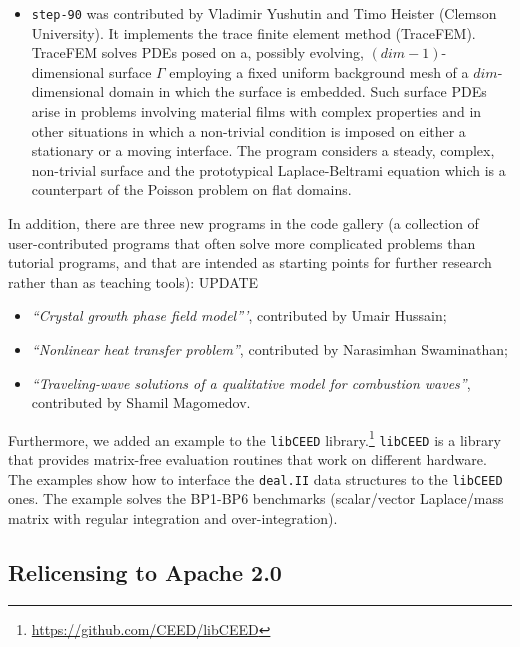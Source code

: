 \documentclass{ansarticle-preprint}
\newcommand{\specialword}[1]{\texttt{#1}}
\newcommand{\dealii}{{\specialword{deal.II}}\xspace}
\begin{document}
\begin{itemize}
  \item
    \texttt{step-90} was contributed by Vladimir Yushutin and Timo Heister (Clemson University).
    It implements the trace finite element method (TraceFEM). TraceFEM solves PDEs
    posed on a, possibly evolving, $(dim-1)$-dimensional surface $\Gamma$ employing
    a fixed uniform background mesh of a $dim$-dimensional domain in which
    the surface is embedded. Such surface PDEs arise in problems involving
    material films with complex properties and in other situations in which
    a non-trivial condition is imposed on either a stationary or a moving interface.
    The program considers a steady, complex, non-trivial surface and the prototypical
    Laplace-Beltrami equation which is a counterpart of
    the Poisson problem on flat domains.
\end{itemize}

In addition, there are three new programs in the code gallery (a collection of
user-contributed programs that often solve more complicated problems
than tutorial programs, and that are intended as starting points for further
research rather than as teaching tools):
UPDATE
\begin{itemize}
  \item \textit{``Crystal growth phase field model'''},
    contributed by Umair Hussain;
  \item \textit{``Nonlinear heat transfer problem''}, contributed by
    Narasimhan Swaminathan;
  \item \textit{``Traveling-wave solutions of a qualitative model for combustion waves''}, contributed by
    Shamil Magomedov.
\end{itemize}

Furthermore, we added an example to the \texttt{libCEED}
library.\footnote{\url{https://github.com/CEED/libCEED}} \texttt{libCEED} is a library
that provides matrix-free evaluation routines that work on different hardware. The
examples show how to interface the \dealii data structures to the \texttt{libCEED} ones.
The example solves the BP1-BP6 benchmarks (scalar/vector Laplace/mass matrix with
regular integration and over-integration).


\subsection{Relicensing to Apache 2.0}\label{sec:license}

\end{document}
